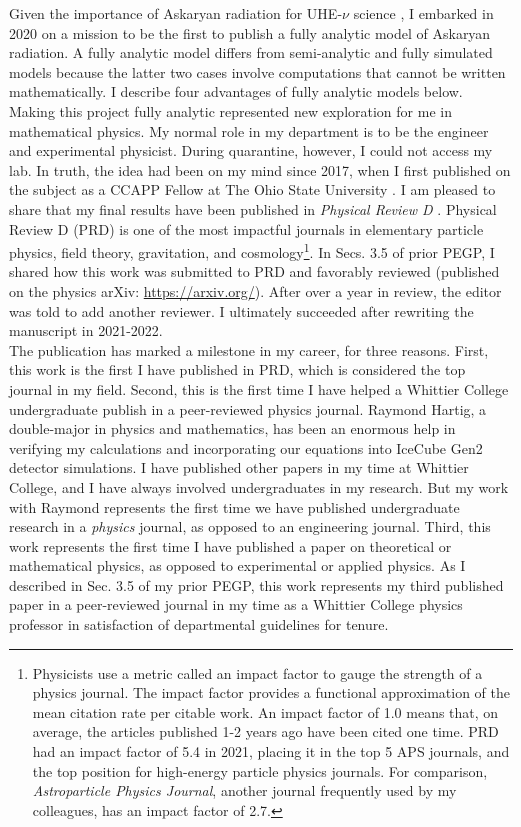 \documentclass[../../../main.tex]{subfiles}
\begin{document}
Given the importance of Askaryan radiation for UHE-$\nu$ science \cite{Askaryan:1962hbi,1962JPSJS..17C.257A,ask1,ask2,PhysRevLett.86.2802,PhysRevLett.99.171101,PhysRevD.101.083005}, I embarked in 2020 on a mission to be the first to publish a fully analytic model of Askaryan radiation.  A fully analytic model differs from semi-analytic and fully simulated models because the latter two cases involve computations that cannot be written mathematically.  I describe four advantages of fully analytic models below.  Making this project fully analytic represented new exploration for me in mathematical physics.  My normal role in my department is to be the engineer and experimental physicist.  During quarantine, however, I could not access my lab.  In truth, the idea had been on my mind since 2017, when I first published on the subject as a CCAPP Fellow at The Ohio State University \cite{10.1016/j.astropartphys.2017.03.008}.  I am pleased to share that my final results have been published in \textit{Physical Review D} \cite{PhysRevD.105.123019}.  Physical Review D (PRD) is one of the most impactful journals in elementary particle physics, field theory, gravitation, and cosmology\footnote{Physicists use a metric called an impact factor to gauge the strength of a physics journal.  The impact factor provides a functional approximation of the mean citation rate per citable work.  An impact factor of 1.0 means that, on average, the articles published 1-2 years ago have been cited one time.  PRD had an impact factor of 5.4 in 2021, placing it in the top 5 APS journals, and the top position for high-energy particle physics journals.  For comparison, \textit{Astroparticle Physics Journal}, another journal frequently used by my colleagues, has an impact factor of 2.7.}.  In Secs. 3.5 of prior PEGP, I shared how this work was submitted to PRD and favorably reviewed (published on the physics arXiv: \url{https://arxiv.org/}).  After over a year in review, the editor was told to add another reviewer.  I ultimately succeeded after rewriting the manuscript in 2021-2022.
\\
\vspace{0.15cm}
The publication has marked a milestone in my career, for three reasons.  First, this work is the first I have published in PRD, which is considered the top journal in my field.  Second, this is the first time I have helped a Whittier College undergraduate publish in a peer-reviewed physics journal.  Raymond Hartig, a double-major in physics and mathematics, has been an enormous help in verifying my calculations and incorporating our equations into IceCube Gen2 detector simulations.  I have published other papers in my time at Whittier College, and I have always involved undergraduates in my research.  But my work with Raymond represents the first time we have published undergraduate research in a \textit{physics} journal, as opposed to an engineering journal.  Third, this work represents the first time I have published a paper on theoretical or mathematical physics, as opposed to experimental or applied physics.  As I described in Sec. 3.5 of my prior PEGP, this work represents my third published paper in a peer-reviewed journal in my time as a Whittier College physics professor in satisfaction of departmental guidelines for tenure.
\end{document}
